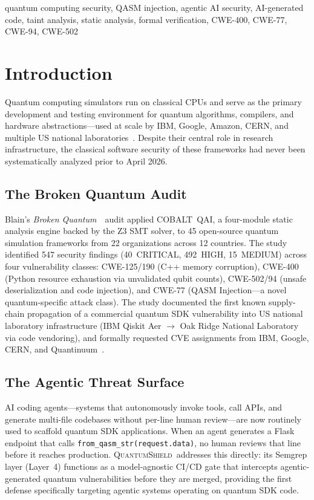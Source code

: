 \documentclass[conference,compsoc]{IEEEtran}
\newcommand{\tool}{\textsc{QuantumShield}}
\newcommand{\broken}{\textit{Broken Quantum}~\cite{blain2026broken}}
\begin{document}
\begin{IEEEkeywords}
quantum computing security, QASM injection, agentic AI security,
AI-generated code, taint analysis, static analysis, formal verification,
CWE-400, CWE-77, CWE-94, CWE-502
\end{IEEEkeywords}

\section{Introduction}
\label{sec:intro}
\noindent Quantum computing simulators run on classical CPUs and serve as the
primary development and testing environment for quantum algorithms,
compilers, and hardware abstractions---used at scale by IBM, Google,
Amazon, CERN, and multiple US national
laboratories~\cite{blain2026broken}.
Despite their central role in research infrastructure, the classical
software security of these frameworks had never been systematically
analyzed prior to April 2026.

\subsection{The Broken Quantum Audit}
\noindent Blain's \broken\ audit applied COBALT~QAI, a four-module static analysis
engine backed by the Z3 SMT solver, to 45 open-source quantum simulation
frameworks from 22 organizations across 12 countries.
The study identified 547 security findings (40~CRITICAL, 492~HIGH,
15~MEDIUM) across four vulnerability classes:
CWE-125/190 (C++ memory corruption),
CWE-400 (Python resource exhaustion via unvalidated qubit counts),
CWE-502/94 (unsafe deserialization and code injection), and
CWE-77 (QASM Injection---a novel quantum-specific attack class).
The study documented the first known supply-chain propagation of a
commercial quantum SDK vulnerability into US national laboratory
infrastructure (IBM Qiskit Aer $\to$ Oak Ridge National Laboratory
via code vendoring), and formally requested CVE assignments from IBM,
Google, CERN, and Quantinuum~\cite{blain2026broken}.

\subsection{The Agentic Threat Surface}
\noindent AI coding agents---systems that autonomously invoke tools, call APIs,
and generate multi-file codebases without per-line human review---are now
routinely used to scaffold quantum SDK applications.
When an agent generates a Flask endpoint that calls
\texttt{from\_qasm\_str(request.data)}, no human reviews that line before
it reaches production.
\tool\ addresses this directly: its Semgrep layer (Layer~4) functions as
a model-agnostic CI/CD gate that intercepts agentic-generated quantum
vulnerabilities before they are merged, providing the first defense
specifically targeting agentic systems operating on quantum SDK code.
\end{document}
